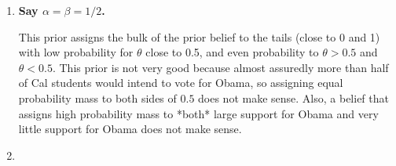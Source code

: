 \documentclass{article}[12pt]
\begin{document}
\begin{enumerate}
	\item \textbf{Say $\alpha = \beta = 1/2$.}
	
	This prior assigns the bulk of the prior belief to the tails (close to 0 and 1) with low probability for $\theta$ close to 0.5, and even probability to $\theta > 0.5$ and $\theta < 0.5$. This prior is not very good because almost assuredly more than half of Cal students would intend to vote for Obama, so assigning equal probability mass to both sides of $0.5$ does not make sense. Also, a belief that assigns high probability mass to *both* large support for Obama and very little support for Obama does not make sense.

	\item 

	\end{enumerate}
\end{document}
